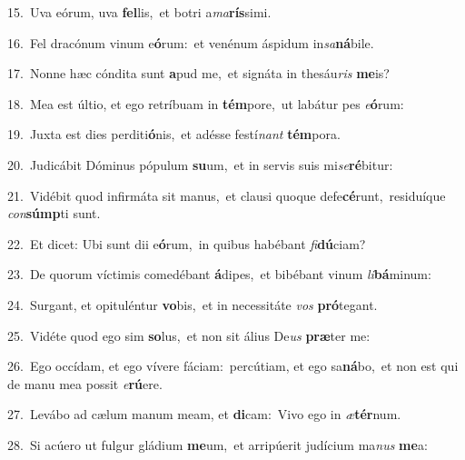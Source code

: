 {\numbfont\textcolor{\numbcolor}{15.}}~Uva eórum, uva \textbf{fel}\-lis,~\star et botri a\-\textit{ma}\-\textbf{rís}simi.\par
{\numbfont\textcolor{\numbcolor}{16.}}~Fel dracónum vinum e\-\textbf{ó}\-rum:~\star et venénum áspidum in\-\textit{sa}\-\textbf{ná}bile.\par
{\numbfont\textcolor{\numbcolor}{17.}}~Nonne hæc cóndita sunt \textbf{a}\-pud me,~\star et signáta in thesáu\textit{ris} \textbf{me}\-is?\par
{\numbfont\textcolor{\numbcolor}{18.}}~Mea est últio, et ego retríbuam in \textbf{tém}\-pore,~\star ut labátur pes \textit{e}\-\textbf{ó}rum:\par
{\numbfont\textcolor{\numbcolor}{19.}}~Juxta est dies perditi\-\textbf{ó}\-nis,~\star et adésse festí\textit{nant} \textbf{tém}\-pora.\par
{\numbfont\textcolor{\numbcolor}{20.}}~Judicábit Dóminus pópulum \textbf{su}\-um,~\star et in servis suis mi\-\textit{se}\-\textbf{ré}bitur:\par
{\numbfont\textcolor{\numbcolor}{21.}}~Vidébit quod infirmáta sit manus,~\dagger et clausi quoque defe\-\textbf{cé}\-runt,~\star residuíque \textit{con}\-\textbf{súmp}ti sunt.\par
{\numbfont\textcolor{\numbcolor}{22.}}~Et dicet: Ubi sunt dii e\-\textbf{ó}\-rum,~\star in quibus habébant \textit{fi}\-\textbf{dú}ciam?\par
{\numbfont\textcolor{\numbcolor}{23.}}~De quorum víctimis comedébant \textbf{á}\-dipes,~\star et bibébant vinum \textit{li}\-\textbf{bá}minum:\par
{\numbfont\textcolor{\numbcolor}{24.}}~Surgant, et opituléntur \textbf{vo}\-bis,~\star et in necessitáte \textit{vos} \textbf{pró}\-tegant.\par
{\numbfont\textcolor{\numbcolor}{25.}}~Vidéte quod ego sim \textbf{so}\-lus,~\star et non sit álius De\textit{us} \textbf{præ}\-ter me:\par
{\numbfont\textcolor{\numbcolor}{26.}}~Ego occídam, et ego vívere fáciam:~\dagger percútiam, et ego sa\-\textbf{ná}\-bo,~\star et non est qui de manu mea possit \textit{e}\-\textbf{rú}ere.\par
{\numbfont\textcolor{\numbcolor}{27.}}~Levábo ad cælum manum meam, et \textbf{di}\-cam:~\star Vivo ego in \textit{æ}\-\textbf{tér}num.\par
{\numbfont\textcolor{\numbcolor}{28.}}~Si acúero ut fulgur gládium \textbf{me}\-um,~\star et arripúerit judícium ma\textit{nus} \textbf{me}\-a:\par
